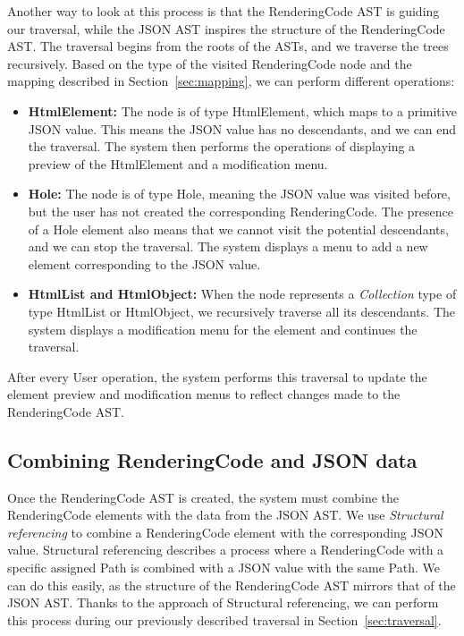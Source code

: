Another way to look at this process is that the RenderingCode AST is guiding our traversal, while the JSON AST inspires the structure of the RenderingCode AST.
The traversal begins from the roots of the ASTs, and we traverse the trees recursively.
Based on the type of the visited RenderingCode node and the mapping described in Section~\ref{sec:mapping}, we can perform different operations:
\begin{itemize}
	\item \textbf{HtmlElement:} The node is of type HtmlElement, which maps to a primitive JSON value. This means the JSON value has no descendants, and we can end the traversal.
	      The system then performs the operations of displaying a preview of the HtmlElement and a modification menu.
	\item \textbf{Hole:} The node is of type Hole, meaning the JSON value was visited before, but the user has not created the corresponding RenderingCode.
	      The presence of a Hole element also means that we cannot visit the potential descendants, and we can stop the traversal.
	      The system displays a menu to add a new element corresponding to the JSON value.

	\item \textbf{HtmlList and HtmlObject:} When the node represents a \emph{Collection} type of type HtmlList or HtmlObject, we recursively traverse all its descendants.
	      The system displays a modification menu for the element and continues the traversal.
\end{itemize}

After every User operation, the system performs this traversal to update the element preview and modification menus to reflect changes made to the RenderingCode AST.

\subsection{Combining RenderingCode and JSON data}
Once the RenderingCode AST is created, the system must combine the RenderingCode elements with the data from the JSON AST.
We use \emph{Structural referencing} to combine a RenderingCode element with the corresponding JSON value.
Structural referencing describes a process where a RenderingCode with a specific assigned Path is combined with a JSON value with the same Path.
We can do this easily, as the structure of the RenderingCode AST mirrors that of the JSON AST.
Thanks to the approach of Structural referencing, we can perform this process during our previously described traversal in Section~\ref{sec:traversal}.


